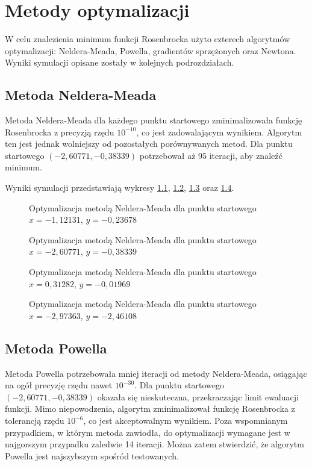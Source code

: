 \chapter{Metody optymalizacji}
W celu znalezienia minimum funkcji Rosenbrocka użyto czterech algorytmów optymalizacji: Neldera-Meada, Powella, gradientów sprzężonych oraz Newtona. Wyniki symulacji opisane zostały w kolejnych podrozdziałach.

\section{Metoda Neldera-Meada}
Metoda Neldera-Meada dla każdego punktu startowego zminimalizowała funkcję Rosenbrocka z precyzją rzędu $10^{-10}$, co jest zadowalającym wynikiem. Algorytm ten jest jednak wolniejszy od pozostałych porównywanych metod. Dla punktu startowego $(-2,60771, -0,38339)$ potrzebował aż 95 iteracji, aby znaleźć minimum.

Wyniki symulacji przedstawiają wykresy \ref{fig:nelder-mead_0}, \ref{fig:nelder-mead_1}, \ref{fig:nelder-mead_2} oraz \ref{fig:nelder-mead_3}.

\begin{figure}
  \centering
  
  \caption{Optymalizacja metodą Neldera-Meada dla punktu startowego $x=-1,12131$, $y=-0,23678$}
  \label{fig:nelder-mead_0}
\end{figure}

\begin{figure}
  \centering
  
  \caption{Optymalizacja metodą Neldera-Meada dla punktu startowego $x=-2,60771$, $y=-0,38339$}
  \label{fig:nelder-mead_1}
\end{figure}

\begin{figure}
  \centering
  
  \caption{Optymalizacja metodą Neldera-Meada dla punktu startowego $x=0,31282$, $y=-0,01969$}
  \label{fig:nelder-mead_2}
\end{figure}

\begin{figure}
  \centering
  
  \caption{Optymalizacja metodą Neldera-Meada dla punktu startowego $x=-2,97363$, $y=-2,46108$}
  \label{fig:nelder-mead_3}
\end{figure}


\section{Metoda Powella}
Metoda Powella potrzebowała mniej iteracji od metody Neldera-Meada, osiągając na ogół precyzję rzędu nawet $10^{-30}$. Dla punktu startowego $(-2,60771, -0,38339)$ okazała się nieskuteczna, przekraczając limit ewaluacji funkcji. Mimo niepowodzenia, algorytm zminimalizował funkcję Rosenbrocka z tolerancją rzędu $10^{-6}$, co jest akceptowalnym wynikiem. Poza wspomnianym przypadkiem, w którym metoda zawiodła, do optymalizacji wymagane jest w najgorszym przypadku zaledwie 14 iteracji. Można zatem stwierdzić, że algorytm Powella jest najszybszym spośród testowanych.


